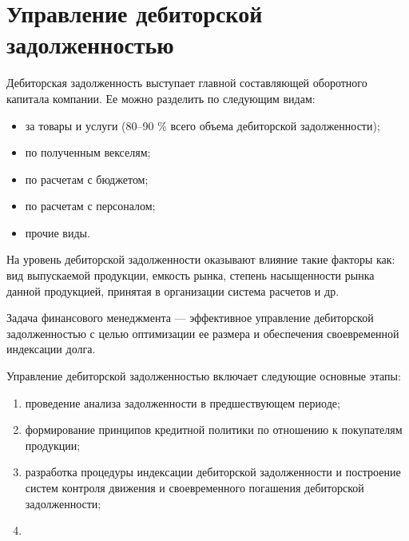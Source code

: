 \section{Управление дебиторской задолженностью}

Дебиторская задолженность выступает главной составляющей оборотного капитала компании. Ее можно разделить по следующим видам:
\begin{itemize}
	\item за товары и услуги (80--90 \% всего объема дебиторской задолженности);
	\item по полученным векселям;
	\item по расчетам с бюджетом;
	\item по расчетам с персоналом;
	\item прочие виды.
\end{itemize}

На уровень дебиторской задолженности оказывают влияние такие факторы как: вид выпускаемой продукции, емкость рынка, степень насыщенности рынка данной продукцией, принятая в организации система расчетов и др.

Задача финансового менеджмента --- эффективное управление дебиторской задолженностью с целью оптимизации ее размера и обеспечения своевременной индексации долга.

Управление дебиторской задолженностью включает следующие основные этапы:
\begin{enumerate}
	\item проведение анализа задолженности в предшествующем периоде;
	\item формирование принципов кредитной политики по отношению к покупателям продукции;
	\item разработка процедуры индексации дебиторской задолженности и построение систем контроля движения и своевременного  погашения дебиторской задолженности;
	\item 
\end{enumerate}
